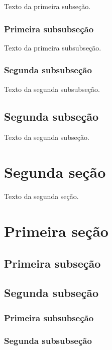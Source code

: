 \documentclass[a4paper,12pt,oneside,onecolumn]{uerj/uerj}
\begin{document}
Texto da primeira subseção.

\subsubsection{Primeira subsubseção}

Texto da primeira subsubseção.

\subsubsection{Segunda subsubseção}

Texto da segunda subsubseção.

\subsection{Segunda subseção}

Texto da segunda subseção.

\section{Segunda seção}

Texto da segunda seção.


\section{Primeira seção}

\subsection{Primeira subseção}

\subsection{Segunda subseção}

\subsubsection{Primeira subsubseção}

\subsubsection{Segunda subsubseção}
\end{document}
